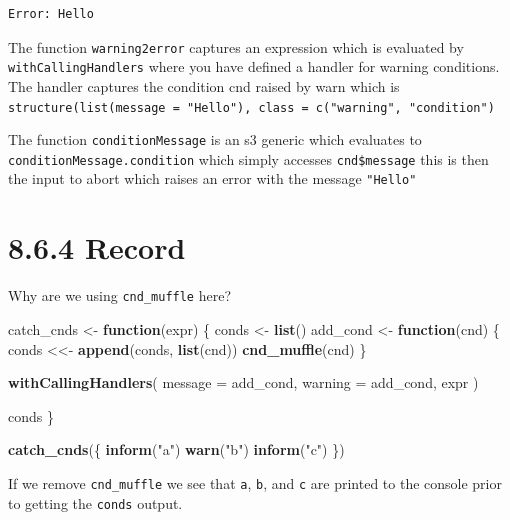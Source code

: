 \documentclass[]{book}
\newenvironment{Shaded}{\begin{snugshade}}{\end{snugshade}}
\newcommand{\ControlFlowTok}[1]{\textcolor[rgb]{0.13,0.29,0.53}{\textbf{#1}}}
\newcommand{\DataTypeTok}[1]{\textcolor[rgb]{0.13,0.29,0.53}{#1}}
\newcommand{\KeywordTok}[1]{\textcolor[rgb]{0.13,0.29,0.53}{\textbf{#1}}}
\newcommand{\NormalTok}[1]{#1}
\newcommand{\StringTok}[1]{\textcolor[rgb]{0.31,0.60,0.02}{#1}}
\begin{document}
\begin{verbatim}
Error: Hello
\end{verbatim}

The function \texttt{warning2error} captures an expression which is evaluated by \texttt{withCallingHandlers} where you have defined a handler for warning conditions. The handler captures the condition cnd raised by warn which is \texttt{structure(list(message\ =\ "Hello"),\ class\ =\ c("warning",\ "condition")}

The function \texttt{conditionMessage} is an s3 generic which evaluates to \texttt{conditionMessage.condition} which simply accesses \texttt{cnd\$message} this is then the input to abort which raises an error with the message \texttt{"Hello"}

\hypertarget{record}{%
\section*{8.6.4 Record}\label{record}}

Why are we using \texttt{cnd\_muffle} here?

\begin{Shaded}
\begin{Highlighting}[]
\NormalTok{catch_cnds <-}\StringTok{ }\ControlFlowTok{function}\NormalTok{(expr) \{}
\NormalTok{  conds <-}\StringTok{ }\KeywordTok{list}\NormalTok{()}
\NormalTok{  add_cond <-}\StringTok{ }\ControlFlowTok{function}\NormalTok{(cnd) \{}
\NormalTok{    conds <<-}\StringTok{ }\KeywordTok{append}\NormalTok{(conds, }\KeywordTok{list}\NormalTok{(cnd))}
    \KeywordTok{cnd_muffle}\NormalTok{(cnd)}
\NormalTok{  \}}
  
  \KeywordTok{withCallingHandlers}\NormalTok{(}
    \DataTypeTok{message =}\NormalTok{ add_cond,}
    \DataTypeTok{warning =}\NormalTok{ add_cond,}
\NormalTok{    expr}
\NormalTok{  )}
  
\NormalTok{  conds}
\NormalTok{\}}

\KeywordTok{catch_cnds}\NormalTok{(\{}
  \KeywordTok{inform}\NormalTok{(}\StringTok{"a"}\NormalTok{)}
  \KeywordTok{warn}\NormalTok{(}\StringTok{"b"}\NormalTok{)}
  \KeywordTok{inform}\NormalTok{(}\StringTok{"c"}\NormalTok{)}
\NormalTok{\})}
\end{Highlighting}
\end{Shaded}

If we remove \texttt{cnd\_muffle} we see that \texttt{a}, \texttt{b}, and \texttt{c} are printed to the console prior to getting the \texttt{conds} output.
\end{document}
